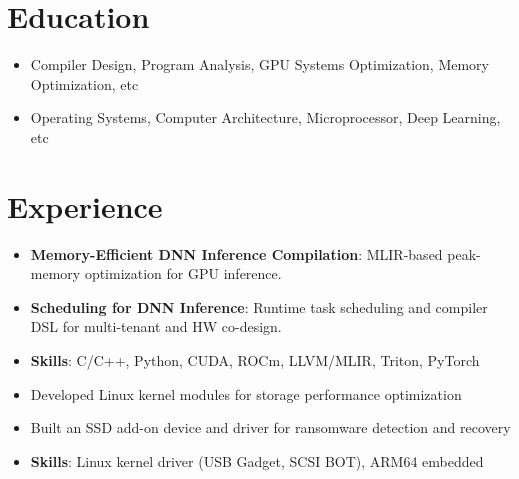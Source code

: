 \documentclass{cv}
\begin{document}
\nocite{*}

\makecvtitle

\section{Education}

 
\begin{itemize}
  \item Compiler Design, Program Analysis, GPU Systems Optimization, Memory Optimization, etc
\end{itemize}

\vspace{0.4em}

 
\begin{itemize}
  \item Operating Systems, Computer Architecture, Microprocessor, Deep Learning, etc
\end{itemize}


\section{Experience}

\begin{itemize}
  \item \textbf{Memory-Efficient DNN Inference Compilation}: MLIR-based peak-memory optimization for GPU inference. 
  \item \textbf{Scheduling for DNN Inference}: Runtime task scheduling and compiler DSL for multi-tenant and HW co-design. 
  \item \textbf{Skills}: C/C++, Python, CUDA, ROCm, LLVM/MLIR, Triton, PyTorch
\end{itemize}

\vspace{0.4em}

\begin{itemize}
  \item Developed Linux kernel modules for storage performance optimization
  \item Built an SSD add-on device and driver for ransomware detection and recovery
  \item \textbf{Skills}: Linux kernel driver (USB Gadget, SCSI BOT), ARM64 embedded
\end{itemize}
\end{document}
